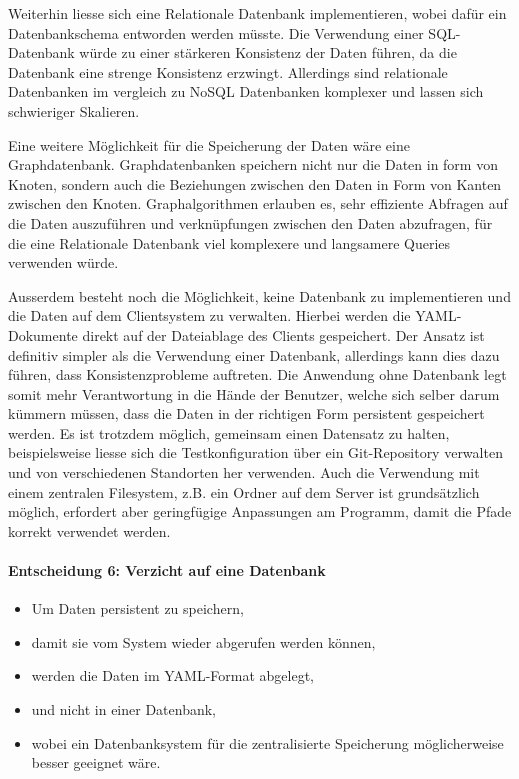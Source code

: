 \documentclass[
	ngerman,
	toc=listof, %
	toc=bibliography, %
	footnotes=multiple, %
	parskip=half, %
	numbers=noendperiod %
]{scrartcl}
\begin{document}
		Weiterhin liesse sich eine Relationale Datenbank implementieren, wobei dafür ein Datenbankschema entworden werden müsste.
		Die Verwendung einer SQL-Datenbank würde zu einer stärkeren Konsistenz der Daten führen, da die Datenbank eine strenge Konsistenz erzwingt.
		Allerdings sind relationale Datenbanken im vergleich zu NoSQL Datenbanken komplexer und lassen sich schwieriger Skalieren.

		Eine weitere Möglichkeit für die Speicherung der Daten wäre eine Graphdatenbank. Graphdatenbanken speichern nicht nur die Daten in form von Knoten, sondern auch die Beziehungen zwischen den Daten in Form von Kanten zwischen den Knoten.
		Graphalgorithmen erlauben es, sehr effiziente Abfragen auf die Daten auszuführen und verknüpfungen zwischen den Daten abzufragen, für die eine Relationale Datenbank viel komplexere und langsamere Queries verwenden würde.

		Ausserdem besteht noch die Möglichkeit, keine Datenbank zu implementieren und die Daten auf dem Clientsystem zu verwalten.
		Hierbei werden die YAML-Dokumente direkt auf der Dateiablage des Clients gespeichert. 
		Der Ansatz ist definitiv simpler als die Verwendung einer Datenbank, allerdings kann dies dazu führen, dass Konsistenzprobleme auftreten.
		Die Anwendung ohne Datenbank legt somit mehr Verantwortung in die Hände der Benutzer, welche sich selber darum kümmern müssen, dass die Daten in der richtigen Form persistent gespeichert werden.
		Es ist trotzdem möglich, gemeinsam einen Datensatz zu halten, beispielsweise liesse sich die Testkonfiguration über ein Git-Repository verwalten und von verschiedenen Standorten her verwenden.
		Auch die Verwendung mit einem zentralen Filesystem, z.B. ein Ordner auf dem Server ist grundsätzlich möglich, erfordert aber geringfügige Anpassungen am Programm, damit die Pfade korrekt verwendet werden.

		\paragraph{Entscheidung 6: Verzicht auf eine Datenbank}
		\begin{itemize}
			\item Um Daten persistent zu speichern, 
			\item damit sie vom System wieder abgerufen werden können,
			\item werden die Daten im YAML-Format abgelegt,
			\item und nicht in einer Datenbank,
			\item wobei ein Datenbanksystem für die zentralisierte Speicherung möglicherweise besser geeignet wäre.
		\end{itemize}
		\newpage
\end{document}
